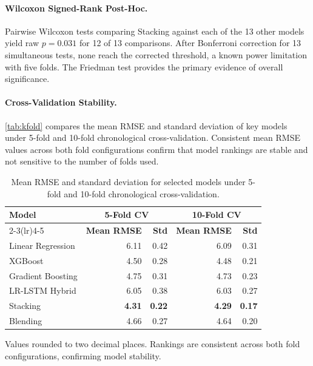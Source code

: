 \documentclass[a4paper,fleqn]{cas-dc}
\begin{document}
\paragraph{Wilcoxon Signed-Rank Post-Hoc.}  Pairwise Wilcoxon tests comparing Stacking against each of the 13 other models yield raw $p = 0.031$ for 12 of 13 comparisons.  After Bonferroni correction for 13 simultaneous tests, none reach the corrected threshold, a known power limitation with five folds.  The Friedman test provides the primary evidence of overall significance.

\paragraph{Cross-Validation Stability.}  \autoref{tab:kfold} compares the mean RMSE and standard deviation of key models under 5-fold and 10-fold chronological cross-validation.  Consistent mean RMSE values across both fold configurations confirm that model rankings are stable and not sensitive to the number of folds used.

\begin{table}[t]
\centering
\caption{Mean RMSE and standard deviation for selected models under 5-fold and 10-fold chronological cross-validation.\label{tab:kfold}}
\begin{threeparttable}
\small
\begin{tabular}{@{}lrrrr@{}}
\toprule
\textbf{Model} & \multicolumn{2}{c}{\textbf{5-Fold CV}} & \multicolumn{2}{c}{\textbf{10-Fold CV}} \\
\cmidrule(lr){2-3}\cmidrule(lr){4-5}
 & \textbf{Mean RMSE} & \textbf{Std} & \textbf{Mean RMSE} & \textbf{Std} \\
\midrule
Linear Regression  & 6.11 & 0.42 & 6.09 & 0.31 \\
XGBoost            & 4.50 & 0.28 & 4.48 & 0.21 \\
Gradient Boosting  & 4.75 & 0.31 & 4.73 & 0.23 \\
LR-LSTM Hybrid     & 6.05 & 0.38 & 6.03 & 0.27 \\
Stacking           & \textbf{4.31} & \textbf{0.22} & \textbf{4.29} & \textbf{0.17} \\
Blending           & 4.66 & 0.27 & 4.64 & 0.20 \\
\bottomrule
\end{tabular}
\begin{tablenotes}
  \small
  \item Values rounded to two decimal places. Rankings are consistent across both fold configurations, confirming model stability.
\end{tablenotes}
\end{threeparttable}
\end{table}
\end{document}
